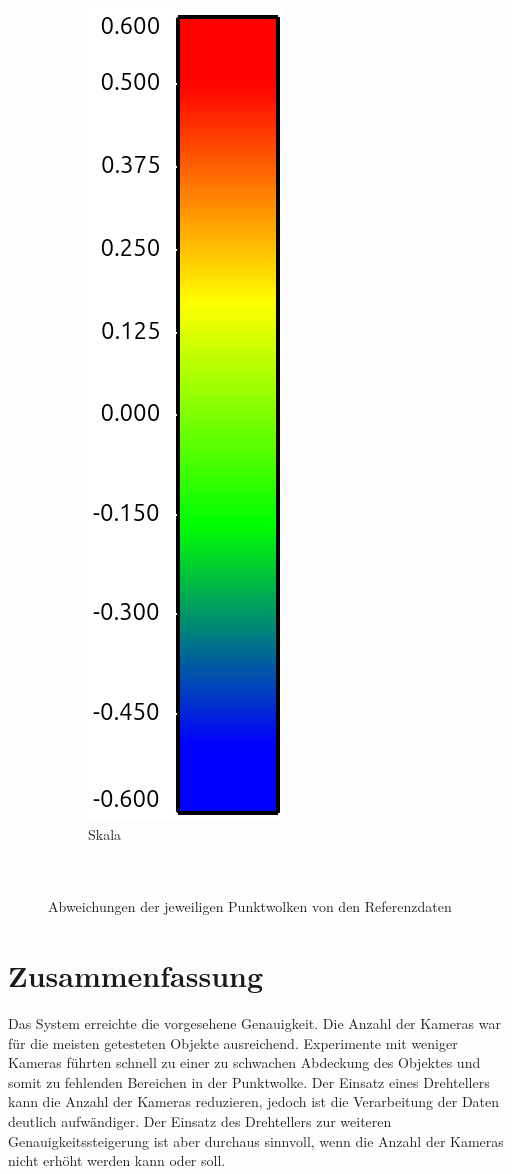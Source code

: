 \documentclass[./00PhotoBox.tex]{subfiles}
\begin{document}
\begin{figure}
\begin{subfigure}{0.30\textwidth}
        \includegraphics[width=0.33\linewidth]{img/7_versuche/cam_anzahl/scala.png}
        \caption{Skala\\~\\~}
    \end{subfigure}

    \caption{Abweichungen der jeweiligen Punktwolken von den Referenzdaten}
    \label{img:ueberblick_cam_anzahl}
\end{figure}


\section{Zusammenfassung}
Das System erreichte die vorgesehene Genauigkeit. Die Anzahl der Kameras war für die meisten getesteten Objekte ausreichend. Experimente mit weniger Kameras führten schnell zu einer zu schwachen Abdeckung des Objektes und somit zu fehlenden Bereichen in der Punktwolke. Der Einsatz eines Drehtellers kann die Anzahl der Kameras reduzieren, jedoch ist die Verarbeitung der Daten deutlich aufwändiger. Der Einsatz des Drehtellers zur weiteren Genauigkeitssteigerung ist aber durchaus sinnvoll, wenn die Anzahl der Kameras nicht erhöht werden kann oder soll.

\biblio
\end{document}
